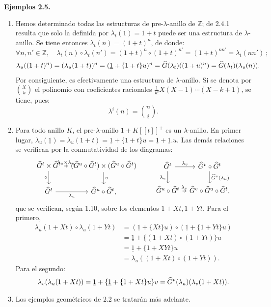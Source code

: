 \textbf{Ejemplos 2.5.}
\begin{enumerate}[label=\alph*)]
\item Hemos determinado todas las estructuras de pre-\(\lambda\)-anillo de \(\mathbb Z\); de 2.4.1 resulta que solo la definida por \(\lambda_t(1)=1+t\) puede ser una estructura de \(\lambda\)-anillo. Se tiene entonces \(\lambda_t(n)=(1+t)^n\), de donde:
\[
  \forall n,n'\in\mathbb Z,\quad
  \lambda_t(n)\circ\lambda_t(n')=(1+t)^n\circ(1+t)^{n'}
  =(1+t)^{nn'}=\lambda_t(nn')~;
\]
\[
  \lambda_u((1+t)^n)
  =
  (\lambda_u(1+t))^n
  =
  (\underline 1+\{1+t\}u)^n
  =
  \widehat G(\lambda_t)((1+u)^n)
  =
  \widehat G(\lambda_t)(\lambda_u(n)).
\]
Por consiguiente, es efectivamente una estructura de \(\lambda\)-anillo. Si se denota por \(\binom{X}{k}\) el polinomio con coeficientes racionales \(\frac{1}{k!}X(X-1)\cdots(X-k+1)\), se tiene, pues:
\begin{equation}\tag{2.5.1}
  \lambda^i(n)=\binom{n}{i}.
\end{equation}

\item Para todo anillo \(K\), el pre-\(\lambda\)-anillo \(1+K[[t]]^+\) es un \(\lambda\)-anillo. En primer lugar, \(\lambda_u(\underline 1)=\lambda_u(1+t)=\underline 1+\{1+t\}u=\underline 1+\underline 1.u\). Las demás relaciones se verifican por la conmutatividad de los diagramas:
\[
\begin{tikzcd}[column sep=tiny]
\Ghat^t\times\Ghat^t \arrow[r,"\lambda_u\times\lambda_u"] \arrow[d,"\circ"'] &
(\Ghat^u\circ\Ghat^t)\times(\Ghat^u\circ\Ghat^t) \arrow[d,"\circ"]\\
\Ghat^t \arrow[r,"\lambda_u"'] &
\Ghat^u\circ\Ghat^t,
\end{tikzcd}
\qquad
\begin{tikzcd}[column sep=tiny]
\Ghat^t \arrow[r,"\lambda_v"] \arrow[d,"\lambda_u"'] &
\Ghat^v\circ\Ghat^t \arrow[d,"\Ghat^v(\lambda_u)"]\\
\Ghat^u\circ\Ghat^t \arrow[r,"\lambda_v"] &
\Ghat^v\circ\Ghat^u\circ\Ghat^t,
\end{tikzcd}
\]
que se verifican, según 1.10, sobre los elementos \(1+Xt,1+Yt\). Para el primero,
\[
\begin{aligned}
\lambda_u(1+Xt)\circ\lambda_u(1+Yt)
&=(\underline 1+\{Xt\}u)\circ(\underline 1+\{1+Yt\}u)\\
&=\underline 1+\{(1+Xt)\circ(1+Yt)\}u\\
&=\underline 1+\{1+XYt\}u\\
&=\lambda_u((1+Xt)\circ(1+Yt)).
\end{aligned}
\]
Para el segundo:
\[
  \lambda_v(\lambda_u(1+Xt))
  =
  \underline 1+\{\underline 1+\{1+Xt\}u\}v
  =
  \widehat G^v(\lambda_u)(\lambda_v(1+Xt)).
\]

\item Los ejemplos geométricos de 2.2 se tratarán más adelante.
\end{enumerate}


